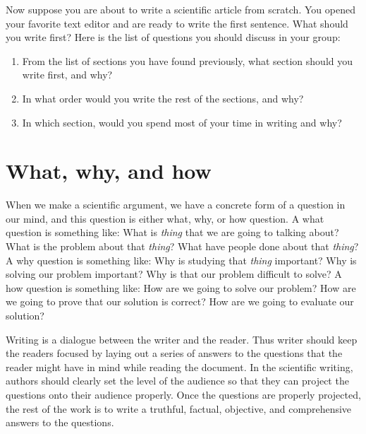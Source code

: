 \documentclass{article}
\begin{document}
Now suppose you are about to write a scientific article from scratch.
You opened your favorite text editor and are ready to write the first sentence.
What should you write first?
Here is the list of questions you should discuss in your group:
\begin{enumerate}
    \item From the list of sections you have found previously, what section should you write first, and why?
    \vspace{2in}
    \item In what order would you write the rest of the sections, and why?
    \vspace{2in}
    \item In which section, would you spend most of your time in writing and why?
    \vspace{2in}
\end{enumerate}


\newpage
\section{What, why, and how}

When we make a scientific argument, we have a concrete form of a question in our mind, and this question is either what, why, or how question.
A what question is something like: What is \textit{thing} that we are going to talking about? What is the problem about that \textit{thing}? What have people done about that \textit{thing}?
A why question is something like: Why is studying that \textit{thing} important? Why is solving our problem important? Why is that our problem difficult to solve?
A how question is something like: How are we going to solve our problem? How are we going to prove that our solution is correct? How are we going to evaluate our solution?

Writing is a dialogue between the writer and the reader.
Thus writer should keep the readers focused by laying out a series of answers to the questions that the reader might have in mind while reading the document.
In the scientific writing, authors should clearly set the level of the audience so that they can project the questions onto their audience properly.
Once the questions are properly projected, the rest of the work is to write a truthful, factual, objective, and comprehensive answers to the questions.
\end{document}

